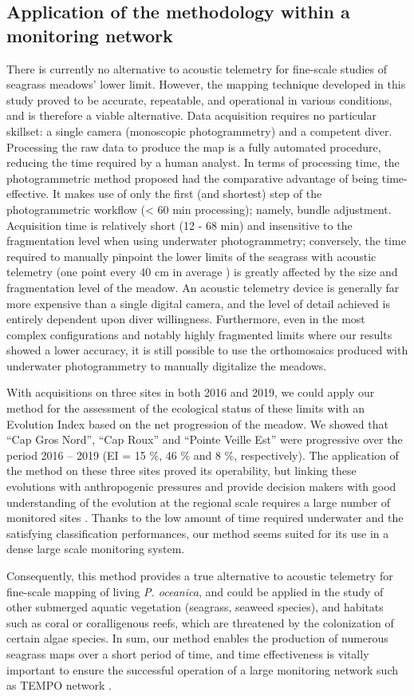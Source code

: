 \subsection{Application of the methodology within a monitoring network}
There is currently no alternative to acoustic telemetry for fine-scale studies of seagrass meadows’ lower limit. However, the mapping technique developed in this study proved to be accurate, repeatable, and operational in various conditions, and is therefore a viable alternative. Data acquisition requires no particular skillset: a single camera (monoscopic photogrammetry) and a competent diver. Processing the raw data to produce the map is a fully automated procedure, reducing the time required by a human analyst. In terms of processing time, the photogrammetric method proposed had the comparative advantage of being time-effective. It makes use of only the first (and shortest) step of the photogrammetric workflow (< 60 min processing); namely, bundle adjustment. Acquisition time is relatively short (12 - 68 min) and insensitive to the fragmentation level when using underwater photogrammetry; conversely, the time required to manually pinpoint the lower limits of the seagrass with acoustic telemetry (one point every 40 cm in average \citep{descamp_fast_2011}) is greatly affected by the size and fragmentation level of the meadow. An acoustic telemetry device is generally far more expensive than a single digital camera, and the level of detail achieved is entirely dependent upon diver willingness. Furthermore, even in the most complex configurations and notably highly fragmented limits where our results showed a lower accuracy, it is still possible to use the orthomosaics produced with underwater photogrammetry to manually digitalize the meadows.

With acquisitions on three sites in both 2016 and 2019, we could apply our method for the assessment of the ecological status of these limits with an Evolution Index based on the net progression of the meadow. We showed that “Cap Gros Nord”, “Cap Roux” and “Pointe Veille Est” were progressive over the period 2016 – 2019 (EI = 15 \%, 46 \% and 8 \%, respectively). The application of the method on these three sites proved its operability, but linking these evolutions with anthropogenic pressures and provide decision makers with good understanding of the evolution at the regional scale  requires a large number of monitored sites \citep{marba_mediterranean_2014, holon_impact_2015, de_los_santos_recent_2019}. Thanks to the low amount of time required underwater and the satisfying classification performances, our method seems suited for its use in a dense large scale monitoring system.

Consequently, this method provides a true alternative to acoustic telemetry for fine-scale mapping of living \textit{P. oceanica}, and could be applied in the study of other submerged aquatic vegetation (seagrass, seaweed species), and habitats such as coral or coralligenous reefs, which are threatened by the colonization of certain algae species. In sum, our method enables the production of numerous seagrass maps over a short period of time, and time effectiveness is vitally important to ensure the successful operation of a large monitoring network such as TEMPO network \citep{andromede-oceanologie_tempo_2020}.

